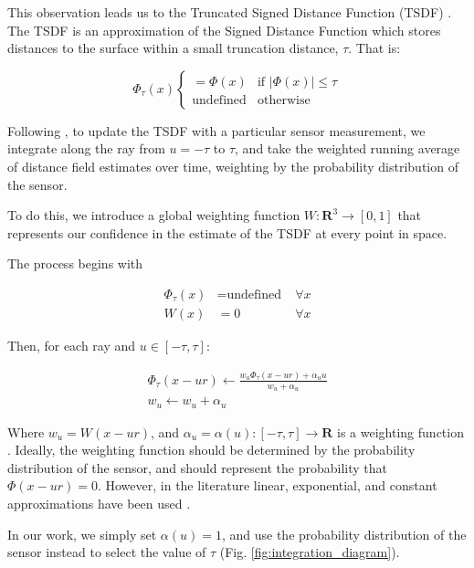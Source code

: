 \documentclass[conference,10pt]{IEEEtran}
\begin{document}
This observation leads us to the Truncated Signed Distance Function (TSDF)
\cite{Curless1996}. The TSDF is an approximation of the  Signed Distance
Function which stores distances to the surface within a small truncation
distance, $\tau$. That is:

$$ \Phi_{\tau}(x) \begin{cases}
	 = \Phi(x) & \text{if } |\Phi(x)| \leq \tau \\ 
	 \text{undefined} & \text{otherwise}
	 \end{cases}
$$

Following \cite{Curless1996}, to update the TSDF with a particular sensor
measurement, we integrate along the ray from $u = -\tau$ to $\tau$, and take the
weighted running average of distance field estimates over time, weighting by the
probability distribution of the sensor.

To do this, we introduce a global weighting function $W : \mathbf{R}^3 \to [0,
1]$ that represents our confidence in the estimate of the TSDF at every point in
space.

The process begins with 

\begin{align*}
\Phi_{\tau}(x)& = \text{undefined} \;&\forall x  \\
%
 W(x)&= 0 \; &\forall x 
\end{align*}

Then, for each ray and $u\in[-\tau, \tau]$:

\begin{subequations}
\begin{align}
\Phi_{\tau}(x - ur) \gets \frac{w_u \Phi_{\tau}(x - ur) + \alpha_u u}{w_u
+\alpha_u}
\\
%
w_u \gets w_u+ \alpha _u
\end{align}
\label{eqn:update}
\end{subequations}

\noindent Where  $w_u = W(x - ur)$, and $\alpha_u  = \alpha(u) : [-\tau,\tau]\to
\mathbf{R} $ is a weighting function . Ideally, the weighting function should be
determined by the probability distribution of the sensor, and should represent
the probability that $\Phi(x - ur) = 0$. However, in the literature linear,
exponential, and constant approximations have been used \cite{Curless1996,
Newcombe, Whelan2013, Bylow2013}. 

In our work, we simply set $\alpha(u) = 1$, and use the probability distribution
of the sensor instead to select the value of $\tau$ (Fig.
\ref{fig:integration_diagram}).
\end{document}

